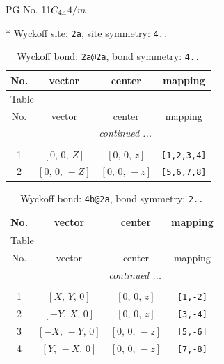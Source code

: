 \documentclass[fleqn,8pt]{jsarticle}
\begin{document}
\setcounter{MaxMatrixCols}{32}

\renewcommand{\tablename}{Table~}
\renewcommand{\figurename}{Figure~}
\begin{center}
\LARGE
PG No. 11\quad$C_{\rm 4h}$\quad$4/m$\quad[ tetragonal ]
\end{center}


* Wyckoff site: {\tt 2a}, site symmetry: {\tt 4..}
\renewcommand{\arraystretch}{1.2}
\begin{longtable}{cccc}
\caption{Wyckoff bond: {\tt 2a@2a}, bond symmetry: {\tt 4..}}
 \\
 \hline \hline
No. & vector & center & mapping \\ \hline \endfirsthead

\multicolumn{3}{l}{\tablename\ \thetable{}} \\
 \hline \hline
No. & vector & center & mapping \\ \hline \endhead

 \hline \hline
\multicolumn{3}{r}{\footnotesize\it continued ...} \\ \endfoot

 \hline \hline
\multicolumn{3}{r}{} \\ \endlastfoot

1 & $\left[ 0,\, 0,\, Z \right]$ & $\left[ 0,\, 0,\, z \right]$ & {\tt [1,2,3,4]} \\ \hline
2 & $\left[ 0,\, 0,\, - Z \right]$ & $\left[ 0,\, 0,\, - z \right]$ & {\tt [5,6,7,8]} \\
\end{longtable}
\renewcommand{\arraystretch}{1.2}
\begin{longtable}{cccc}
\caption{Wyckoff bond: {\tt 4b@2a}, bond symmetry: {\tt 2..}}
 \\
 \hline \hline
No. & vector & center & mapping \\ \hline \endfirsthead

\multicolumn{3}{l}{\tablename\ \thetable{}} \\
 \hline \hline
No. & vector & center & mapping \\ \hline \endhead

 \hline \hline
\multicolumn{3}{r}{\footnotesize\it continued ...} \\ \endfoot

 \hline \hline
\multicolumn{3}{r}{} \\ \endlastfoot

1 & $\left[ X,\, Y,\, 0 \right]$ & $\left[ 0,\, 0,\, z \right]$ & {\tt [1,-2]} \\ \hline
2 & $\left[ - Y,\, X,\, 0 \right]$ & $\left[ 0,\, 0,\, z \right]$ & {\tt [3,-4]} \\ \hline
3 & $\left[ - X,\, - Y,\, 0 \right]$ & $\left[ 0,\, 0,\, - z \right]$ & {\tt [5,-6]} \\ \hline
4 & $\left[ Y,\, - X,\, 0 \right]$ & $\left[ 0,\, 0,\, - z \right]$ & {\tt [7,-8]} \\
\end{longtable}
\end{document}
